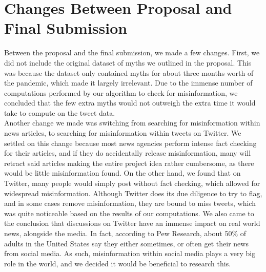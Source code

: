 \documentclass[fontsize=11pt]{article}
\begin{document}
    \section*{Changes Between Proposal and Final Submission}
    Between the proposal and the final submission, we made a few changes. First, we did not include the original dataset of myths we outlined in the proposal. This was because the dataset only contained myths for about three months worth of the pandemic, which made it largely irrelevant. Due to the immense number of computations performed by our algorithm to check for misinformation, we concluded that the few extra myths would not outweigh the extra time it would take to compute on the tweet data. \\
    Another change we made was switching from searching for misinformation within news articles, to searching for misinformation within tweets on Twitter. We settled on this change because most news agencies perform intense fact checking for their articles, and if they do accidentally release misinformation, many will retract said articles making the entire project idea rather cumbersome, as there would be little misinformation found. On the other hand, we found that on Twitter, many people would simply post without fact checking, which allowed for widespread misinformation. Although Twitter does its due diligence to try to flag, and in some cases remove misinformation, they are bound to miss tweets, which was quite noticeable based on the results of our computations. We also came to the conclusion that discussions on Twitter have an immense impact on real world news, alongside the media. In fact, according to Pew Research, about 50\% of adults in the United States say they either sometimes, or often get their news from social media. As such, misinformation within social media plays a very big role in the world, and we decided it would be beneficial to research this.
\end{document}
